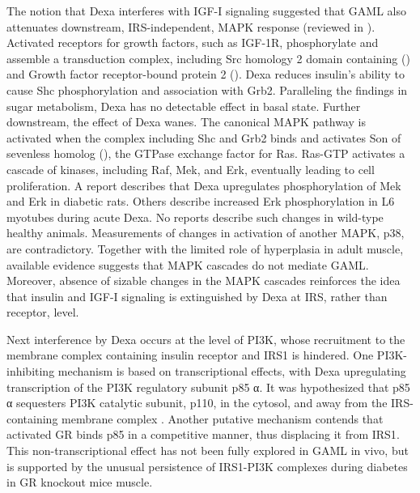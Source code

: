 \documentclass[12pt,english]{report}\usepackage[]{graphicx}\usepackage[]{color}
\begin{document}
The notion that Dexa interferes with IGF-I signaling suggested that
GAML also attenuates downstream, IRS-independent, MAPK response (reviewed
in \citep{mendoza2011ras-erk}). Activated receptors for growth factors,
such as IGF-1R, phosphorylate and assemble a transduction complex,
including Src homology 2 domain containing ()
and Growth factor receptor-bound protein 2 ().
Dexa reduces insulin's ability to cause Shc phosphorylation and association
with Grb2\citep{paez-espinosa1999insulin-induced}. Paralleling the
findings in sugar metabolism, Dexa has no detectable effect in basal
state. Further downstream, the effect of Dexa wanes. The canonical
MAPK pathway is activated when the complex including Shc and Grb2
binds and activates Son of sevenless homolog (),
the GTPase exchange factor for Ras. Ras-GTP activates a cascade of
kinases, including Raf, Mek, and Erk, eventually leading to cell proliferation.
A report describes that Dexa upregulates phosphorylation of Mek and
Erk in diabetic rats\citep{zheng2010foxo3a}. Others describe increased
Erk phosphorylation in L6 myotubes during acute Dexa\citep{giron2015beta-hydroxy-beta-methylbutyrate}.
No reports describe such changes in wild-type healthy animals. Measurements
of changes in activation of another MAPK, p38, are contradictory\citep{qin2010protection,mcclung2010p38}.
Together with the limited role of hyperplasia in adult muscle, available
evidence suggests that MAPK cascades do not mediate GAML. Moreover,
absence of sizable changes in the MAPK cascades reinforces the idea
that insulin and IGF-I signaling is extinguished by Dexa at IRS, rather
than receptor, level.

Next interference by Dexa occurs at the level of PI3K, whose recruitment
to the membrane complex containing insulin receptor and IRS1 is hindered\citep{saad1993modulation,rojas2003regulation}.
One PI3K-inhibiting mechanism is based on transcriptional effects,
with Dexa upregulating transcription of the PI3K regulatory subunit
p85 α\citep{wu2010redd1}. It was hypothesized that p85 α sequesters
PI3K catalytic subunit, p110, in the cytosol, and away from the IRS-containing
membrane complex \citep{saad1993modulation,giorgino1997specific,singleton2000dexamethasone}.
Another putative mechanism contends that activated GR binds p85 in
a competitive manner, thus displacing it from IRS1\citep{hu2009endogenous}.
This non-transcriptional effect has not been fully explored in GAML
in vivo, but is supported by the unusual persistence of IRS1-PI3K
complexes during diabetes in GR knockout mice muscle\citep{hu2009endogenous}.
\end{document}
